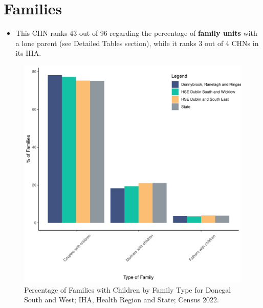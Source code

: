 \documentclass{article}
\begin{document}
\section{Families}\label{sect:Fam}
\begin{itemize}
\item This CHN ranks  43 out of 96 regarding the percentage of \textbf{family units} with a lone parent (see Detailed Tables section), while it ranks   3 out of 4 CHNs in its IHA.
\end{itemize}
\begin{figure}[H]
	\centering
	\includegraphics[width = 150mm]{../figures/FamED.pdf}
	\caption{Percentage of Families with Children by Family Type for Donegal South and West; IHA, Health Region and State; Census 2022.}
	\label{fig:vbnv}
	\end{figure}
	
\end{document}
